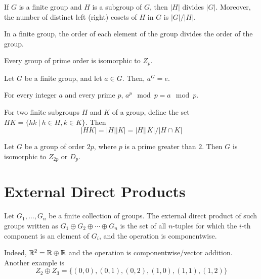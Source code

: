 \documentclass[12pt]{scrartcl}
\begin{document}
\begin{theorem}
  If $G$ is a finite group and $H$ is a subgroup of $G$, then $|H|$ divides 
  $|G|$. Moreover, the number of distinct left (right) cosets of $H$ in $G$ is 
  $|G| / |H|$. 
\end{theorem}

\begin{corollary}
  In a finite group, the order of each element of the group divides the order of the group. 
\end{corollary}

\begin{corollary}
  Every group of prime order is isomorphic to $Z_p$. 
\end{corollary}

\begin{corollary}
  Let $G$ be a finite group, and let $a \in G$. Then, $a^{G} = e$. 
\end{corollary}

\begin{corollary}
  For every integer $a$ and every prime $p$, $a^p \mod p = a \mod p$. 
\end{corollary}

\begin{theorem}
  For two finite subgroups $H$ and $K$ of a group, define the set $HK = \{hk \ | \ h \in H, k \in K\}$. Then
  \[|HK| = |H||K| = |H||K| / |H \cap K|\]
\end{theorem}

\begin{theorem}
  Let $G$ be a group of order $2p$, where $p$ is a prime greater than $2$. Then $G$ is isomorphic to $Z_{2p}$ or $D_p$. 
\end{theorem}

\section{External Direct Products}

\begin{definition}
  Let $G_1, \ldots, G_n$ be a finite collection of groups. The external direct product of such 
  groups written as $G_1 \oplus G_2 \oplus \cdots \oplus G_n$ is the set of all $n$-tuples for which the $i$-th component is an element of $G_i$, and 
  the operation is componentwise.
\end{definition}

\begin{example}
  Indeed, $\mathbb R^2 = \mathbb R \oplus \mathbb R$ and the operation is componentwise/vector addition. Another example is 
  \[Z_2 \oplus Z_3 = \{(0, 0), (0, 1), (0, 2), (1, 0), (1,1), (1,2)\}\]
\end{example}
\end{document}
